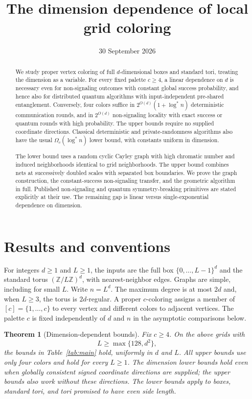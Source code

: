 \documentclass[11pt]{article}
\title{The dimension dependence of local grid coloring}
\author{}
\date{30 September 2026}
\newtheorem{theorem}{Theorem}[section]
\theoremstyle{definition}\newtheorem{definition}[theorem]{Definition}
\theoremstyle{remark}\newtheorem{remark}[theorem]{Remark}
\newcommand{\Z}{\mathbb Z}
\begin{document}
\maketitle

\begin{abstract}
We study proper vertex coloring of full $d$-dimensional boxes and standard
tori, treating the dimension as a variable. For every fixed palette
$c\ge4$, a linear dependence on $d$ is necessary even for non-signaling
outcomes with constant global success probability, and hence also for
distributed quantum algorithms with input-independent pre-shared
entanglement. Conversely, four colors suffice in
$2^{O(d)}(1+\log^*n)$ deterministic communication rounds, and in
$2^{O(d)}$ non-signaling locality with exact success or quantum rounds
with high probability. The upper bounds require no supplied coordinate
directions. Classical deterministic and private-randomness algorithms
also have the usual $\Omega_c(\log^*n)$ lower bound, with constants
uniform in dimension.

The lower bound uses a random cyclic Cayley graph with high chromatic
number and induced neighborhoods identical to grid neighborhoods.
The upper bound combines nets at successively doubled scales with
separated box boundaries. We prove the graph construction, the
constant-success non-signaling transfer, and the geometric algorithm
in full. Published non-signaling and quantum symmetry-breaking
primitives are stated explicitly at their use. The remaining gap is
linear versus single-exponential dependence on dimension.
\end{abstract}

{\small\tableofcontents}
\clearpage

\section{Results and conventions}\label{sec:overview}

For integers $d\ge1$ and $L\ge1$, the inputs are the full box
$\{0,\ldots,L-1\}^d$ and the standard torus $(\Z/L\Z)^d$, with
nearest-neighbor edges. Graphs are simple, including for small $L$.
Write $n=L^d$. The maximum degree is at most $2d$ and, when $L\ge3$,
the torus is $2d$-regular. A proper $c$-coloring assigns a member of
$[c]=\{1,\ldots,c\}$ to every vertex and different colors to adjacent
vertices. The palette $c$ is fixed independently of $d$ and $n$ in
the asymptotic comparisons below.

\begin{theorem}[Dimension-dependent bounds]\label{thm:main}
Fix $c\ge4$. On the above grids with
\begin{equation}\label{eq:large}
                         L\ge\max\{128,d^2\},
\end{equation}
the bounds in Table~\ref{tab:main} hold, uniformly in $d$ and $L$.
All upper bounds use only four colors and hold for every $L\ge1$.
The dimension lower bounds hold even when globally consistent signed
coordinate directions are supplied; the upper bounds also work without
these directions. The lower bounds apply to boxes, standard tori, and
tori promised to have even side length.
\end{theorem}
\end{document}

